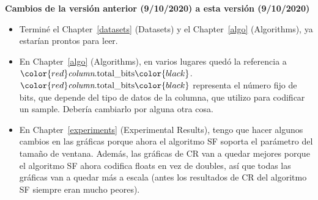 


\newcommand{\column}{\textit{column}}
\newcommand{\totalBits}{\text{total\_bits}}
\newcommand{\colTotBits}{\color{red}\column.\totalBits \color{black}}

\clearpage
\textbf{Cambios de la versión anterior (9/10/2020) a esta versión (9/10/2020) }

\begin{itemize}
\item Terminé el Chapter~\ref{datasets} (Datasets) y el Chapter~\ref{algo} (Algorithms), ya estarían prontos para leer.
\item En Chapter~\ref{algo} (Algorithms), en varios lugares quedó la referencia a $\colTotBits$. $\colTotBits$ representa el número fijo de bits, que depende del tipo de datos de la columna, que utilizo para codificar un sample. Debería cambiarlo por alguna otra cosa.
\item En Chapter~\ref{experiments} (Experimental Results), tengo que hacer algunos cambios en las gráficas porque ahora el algoritmo SF soporta el parámetro del tamaño de ventana. Además, las gráficas de CR van a quedar mejores porque el algoritmo SF ahora codifica floats en vez de doubles, así que todas las gráficas van a quedar más a escala (antes los resultados de CR del algoritmo SF siempre eran mucho peores).
\end{itemize}
